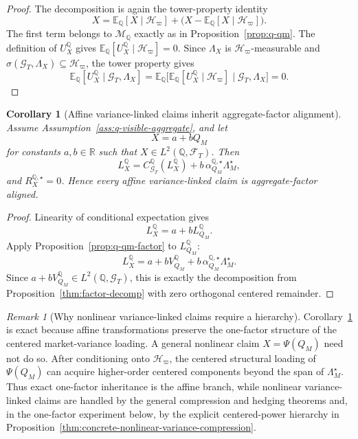 \documentclass[11pt,a4paper]{amsart}
\theoremstyle{plain}
\newtheorem{corollary}[theorem]{Corollary}
\theoremstyle{definition}
\theoremstyle{remark}
\newtheorem{remark}[theorem]{Remark}
\newcommand{\R}{\mathbb{R}}
\newcommand{\QQ}{\mathbb{Q}}
\newcommand{\EE}{\mathbb{E}}
\newcommand{\cF}{\mathcal{F}}
\newcommand{\cG}{\mathcal{G}}
\newcommand{\cH}{\mathcal{H}}
\newcommand{\cM}{\mathcal{M}}
\begin{document}
\begin{proof}
The decomposition is again the tower-property identity
\[
        X
        =
        \EE_\QQ[X\mid \cH_\varpi]
        +
        \bigl(X-\EE_\QQ[X\mid \cH_\varpi]\bigr).
\]
The first term belongs to \(\cM_\QQ\) exactly as in Proposition~\ref{prop:q-qm}.  The definition of
\(U_X^\QQ\) gives \(\EE_\QQ[U_X^\QQ\mid \cH_\varpi]=0\).  Since \(\Lambda_X\) is \(\cH_\varpi\)-measurable and
\(\sigma(\cG_T,\Lambda_X)\subseteq \cH_\varpi\), the tower property gives
\[
        \EE_\QQ[U_X^\QQ\mid \cG_T,\Lambda_X]
        =
        \EE_\QQ\bigl[\EE_\QQ[U_X^\QQ\mid \cH_\varpi]\mid \cG_T,\Lambda_X\bigr]
        =0.
\]
\end{proof}

\begin{corollary}[Affine variance-linked claims inherit aggregate-factor alignment]\label{cor:q-affine-factor}
Assume Assumption~\ref{ass:q-visible-aggregate}, and let
\[
        X=a+bQ_M
\]
for constants \(a,b\in\R\) such that \(X\in L^2(\QQ,\cF_T)\).  Then
\[
        L_X^\QQ
        =
        C_{\cG_T}^\QQ(L_X^\QQ)
        +
        b\,\alpha_{Q_M}^{\QQ,\star}\Lambda_M^\star,
\]
and \(R_X^{\QQ,\star}=0\).  Hence every affine variance-linked claim is aggregate-factor aligned.
\end{corollary}

\begin{proof}
Linearity of conditional expectation gives
\[
        L_X^\QQ
        =
        a+bL_{Q_M}^\QQ.
\]
Apply Proposition~\ref{prop:q-qm-factor} to \(L_{Q_M}^\QQ\):
\[
        L_X^\QQ
        =
        a+bV_{Q_M}^\QQ+b\,\alpha_{Q_M}^{\QQ,\star}\Lambda_M^\star.
\]
Since \(a+bV_{Q_M}^\QQ\in L^2(\QQ,\cG_T)\), this is exactly the decomposition from
Proposition~\ref{thm:factor-decomp} with zero orthogonal centered remainder.
\end{proof}

\begin{remark}[Why nonlinear variance-linked claims require a hierarchy]
Corollary~\ref{cor:q-affine-factor} is exact because affine transformations preserve the
one-factor structure of the centered market-variance loading.  A general nonlinear claim
\(X=\Psi(Q_M)\) need not do so. After conditioning onto \(\cH_\varpi\), the centered structural
loading of \(\Psi(Q_M)\) can acquire higher-order centered components beyond the span of
\(\Lambda_M^\star\).  Thus exact one-factor inheritance is the affine branch, while nonlinear
variance-linked claims are handled by the general compression and hedging theorems and, in the
one-factor experiment below, by the explicit centered-power hierarchy in
Proposition~\ref{thm:concrete-nonlinear-variance-compression}.
\end{remark}
\end{document}
